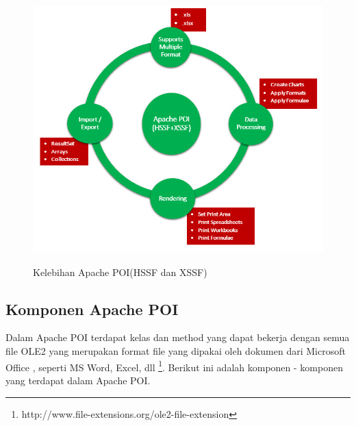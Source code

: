 \begin{figure}[h]
	\centering
	\includegraphics[scale=0.5]{Gambar/apachePOI}
	\caption{Kelebihan Apache POI(HSSF dan XSSF)} \cite{tutpoint}
	\end{figure}

\subsection{Komponen Apache POI}
Dalam Apache POI terdapat kelas dan method yang dapat bekerja dengan semua file OLE2 yang merupakan format file yang dipakai oleh dokumen dari Microsoft Office , seperti MS Word, Excel, dll \footnote{http://www.file-extensions.org/ole2-file-extension}. Berikut ini adalah komponen - komponen yang terdapat dalam Apache POI.\cite{tutpoint}

